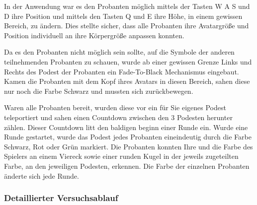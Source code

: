 \documentclass[a4paper,11pt]{article}%
\renewcommand{\\}{\vspace*{0.5\baselineskip} \newline}
\begin{document}
In der Anwendung war es den Probanten möglich mittels der Tasten \dq{}W A S und D\dq{} ihre Position und mittels den Tasten \dq{}Q\dq{} und \dq{}E\dq{} ihre Höhe, in einem gewissen Bereich, zu ändern. Dies stellte sicher, dass alle Probanten ihre Avatargröße und Position individuell an ihre Körpergröße anpassen konnten.

Da es den Probanten nicht möglich sein sollte, auf die Symbole der anderen teilnehmenden Probanten zu schauen, wurde ab einer gewissen Grenze Links und Rechts des Podest der Probanten ein \dq{}Fade-To-Black\dq{} Mechanismus eingebaut. Kamen die Probanten mit dem Kopf ihres Avatars in diesen Bereich, sahen diese nur noch die Farbe Schwarz und mussten sich zurückbewegen.

Waren alle Probanten bereit, wurden diese vor ein für Sie eigenes Podest teleportiert und sahen einen Countdown zwischen den 3 Podesten herunter zählen. Dieser Countdown litt den baldigen beginn einer Runde ein.
Wurde eine Runde gestartet, wurde das Podest jedes Probanten eineindeutig durch die Farbe \dq{}Schwarz, Rot oder Grün\dq{} markiert. Die Probanten konnten Ihre und die Farbe des Spielers an einem Viereck sowie einer runden Kugel in der jeweils zugeteilten Farbe, an den jeweiligen Podesten, erkennen. Die Farbe der einzelnen Probanten änderte sich jede Runde.

	\subsubsection{Detaillierter Versuchsablauf}
\end{document}

